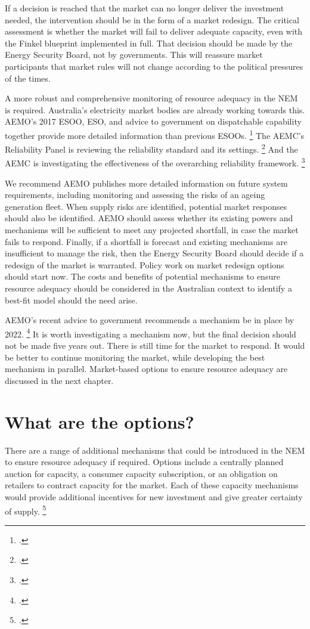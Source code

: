 \documentclass[FrontPage]{grattan}
\begin{document}
If a decision is reached that the market can no longer deliver the investment needed, the intervention should be in the form of a market redesign. The critical assessment is whether the market will fail to deliver adequate capacity, even with the Finkel blueprint implemented in full. That decision should be made by the Energy Security Board, not by governments. This will reassure market participants that market rules will not change according to the political pressures of the times. 

A more robust and comprehensive monitoring of resource adequacy in the NEM is required. Australia’s electricity market bodies are already working towards this. AEMO's 2017 ESOO, ESO, and advice to government on dispatchable capability together provide more detailed information than previous ESOOs.%
\footcites{AEMO2017ESOO}{AEMO2017ESO}{AEMO2017AdviceDispatchableCapacity}
The AEMC's Reliability Panel is reviewing the reliability standard and its settings.%
\footcite{AEMC2017ReliabilityStandardSettingsReview} 
And the AEMC is investigating the effectiveness of the overarching reliability framework.%
\footcite{AEMC2017ReliabilityFrameworksIssuesPaper}

We recommend AEMO publishes more detailed information on future system requirements, including monitoring and assessing the risks of an ageing generation fleet. When supply risks are identified, potential market responses should also be identified. AEMO should assess whether its existing powers and mechanisms will be sufficient to meet any projected shortfall, in case the market fails to respond. Finally, if a shortfall is forecast and existing mechanisms are insufficient to manage the risk, then the Energy Security Board should decide if a redesign of the market is warranted. 
Policy work on market redesign options should start now. The costs and benefits of potential mechanisms to ensure resource adequacy should be considered in the Australian context to identify a best-fit model should the need arise. 

AEMO's recent advice to government recommends a mechanism be in place by 2022.%
\footcite{AEMO2017AdviceDispatchableCapacity}
It is worth investigating a mechanism now, but the final decision should not be made five years out. There is still time for the market to respond. It would be better to continue monitoring the market, while developing the best mechanism in parallel. Market-based options to ensure resource adequacy are discussed in the next chapter.


\chapter{What are the options?}\label{chap:what-are-the-options}
There are a range of additional mechanisms that could be introduced in the NEM to ensure resource adequacy if required. Options include a centrally planned auction for capacity, a consumer capacity subscription, or an obligation on retailers to contract capacity for the market. Each of these capacity mechanisms would provide additional incentives for new investment and give greater certainty of supply.%
\footcite[][15]{CIGRE2016CapacityMechanisms}
\end{document}
